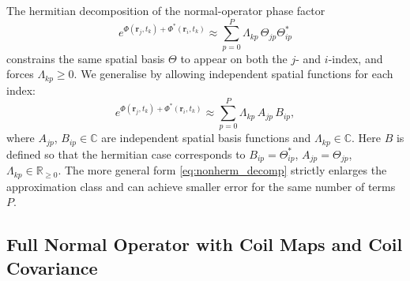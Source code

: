 \documentclass{article}
\begin{document}
The hermitian decomposition of the normal-operator phase factor
\begin{equation}
    e^{\Phi(\mathbf{r}_j, t_k) + \Phi^*(\mathbf{r}_i, t_k)} \approx \sum_{p=0}^P \Lambda_{kp}\,\Theta_{jp}\Theta^*_{ip}
\end{equation}
constrains the same spatial basis $\Theta$ to appear on both the $j$- and $i$-index, and forces $\Lambda_{kp} \geq 0$.
We generalise by allowing independent spatial functions for each index:
\begin{equation}
    e^{\Phi(\mathbf{r}_j, t_k) + \Phi^*(\mathbf{r}_i, t_k)}
    \approx \sum_{p=0}^P \Lambda_{kp}\,A_{jp}\,B_{ip},
    \label{eq:nonherm_decomp}
\end{equation}
where $A_{jp}$, $B_{ip} \in \mathbb{C}$ are independent spatial basis functions and $\Lambda_{kp} \in \mathbb{C}$.
Here $B$ is defined so that the hermitian case corresponds to $B_{ip} = \Theta^*_{ip}$, $A_{jp} = \Theta_{jp}$,
$\Lambda_{kp} \in \mathbb{R}_{\geq 0}$.
The more general form \eqref{eq:nonherm_decomp} strictly enlarges the approximation class and can achieve smaller error for the same number of terms $P$.

\subsection{Full Normal Operator with Coil Maps and Coil Covariance}
\end{document}

